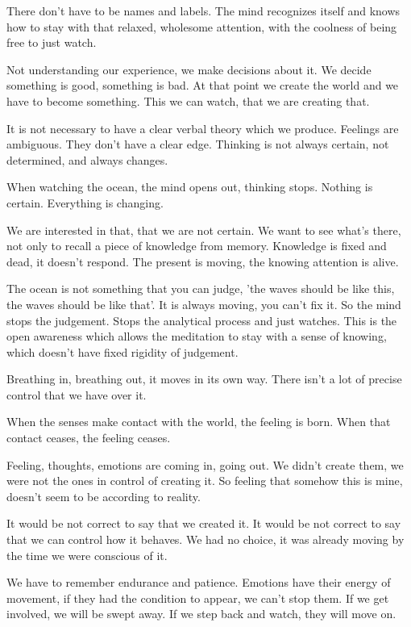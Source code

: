 There don't have to be names and labels. The mind recognizes itself and
knows how to stay with that relaxed, wholesome attention, with the
coolness of being free to just watch.

Not understanding our experience, we make decisions about it. We decide
something is good, something is bad. At that point we create the world
and we have to become something. This we can watch, that we are creating
that.

It is not necessary to have a clear verbal theory which we produce.
Feelings are ambiguous. They don't have a clear edge. Thinking is not
always certain, not determined, and always changes.

When watching the ocean, the mind opens out, thinking stops. Nothing is
certain. Everything is changing.

We are interested in that, that we are not certain. We want to see
what's there, not only to recall a piece of knowledge from memory.
Knowledge is fixed and dead, it doesn't respond. The present is moving,
the knowing attention is alive.

The ocean is not something that you can judge, 'the waves should be like
this, the waves should be like that'. It is always moving, you can't fix
it. So the mind stops the judgement. Stops the analytical process and
just watches. This is the open awareness which allows the meditation to
stay with a sense of knowing, which doesn't have fixed rigidity of
judgement.

Breathing in, breathing out, it moves in its own way. There isn't a lot
of precise control that we have over it.

When the senses make contact with the world, the feeling is born. When
that contact ceases, the feeling ceases.

Feeling, thoughts, emotions are coming in, going out. We didn't create
them, we were not the ones in control of creating it. So feeling that
somehow this is mine, doesn't seem to be according to reality.

It would be not correct to say that we created it. It would be not
correct to say that we can control how it behaves. We had no choice, it
was already moving by the time we were conscious of it.

We have to remember endurance and patience. Emotions have their energy
of movement, if they had the condition to appear, we can't stop them. If
we get involved, we will be swept away. If we step back and watch, they
will move on.

